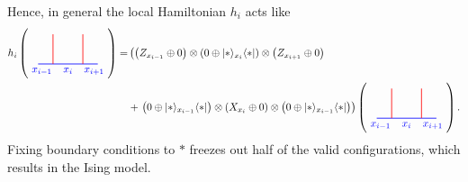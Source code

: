 Hence, in general the local Hamiltonian $h_i$ acts like
	\begin{align*}
		h_i \left(\begin{tikzpicture}[scale=1,baseline=(current bounding box.center)]
		\draw [blue, line width=0.25mm] (-0.5,0) to node[below, near start] {$x_{i-1}$} (0,0);
		\draw [blue, line width=0.25mm] (0,0) to node[below] {$x_i$} (1,0);
		\draw [blue, line width=0.25mm] (1,0) to node[below, near end] {$x_{i+1}$} (1.5,0);
		\draw [red, line width=0.25mm] (0,0) -- (0,1);
		\draw [red, line width=0.25mm] (1,0) -- (1,1);
		\end{tikzpicture}\right)=&\left(\left(Z_{x_{i-1}}\oplus 0\right)\otimes\left(0\oplus\lvert*\rangle_{x_i}\langle*\rvert\right)\otimes\left(Z_{x_{i+1}}\oplus 0\right)\right.\\&+\left.\left(0\oplus\lvert*\rangle_{x_{i-1}}\langle*\rvert\right)\otimes\left(X_{x_i}\oplus 0\right)\otimes\left(0\oplus \lvert *\rangle_{x_{i-1}}\langle *\rvert\right)\right)\left(\begin{tikzpicture}[scale=1,baseline=(current bounding box.center)]
		\draw [blue, line width=0.25mm] (-0.5,0) to node[below, near start] {$x_{i-1}$} (0,0);
		\draw [blue, line width=0.25mm] (0,0) to node[below] {$x_i$} (1,0);
		\draw [blue, line width=0.25mm] (1,0) to node[below, near end] {$x_{i+1}$} (1.5,0);
		\draw [red, line width=0.25mm] (0,0) -- (0,1);
		\draw [red, line width=0.25mm] (1,0) -- (1,1);
		\end{tikzpicture}\right).
	\end{align*}
Fixing boundary conditions to $*$ freezes out half of the valid configurations, which results in the Ising model.
